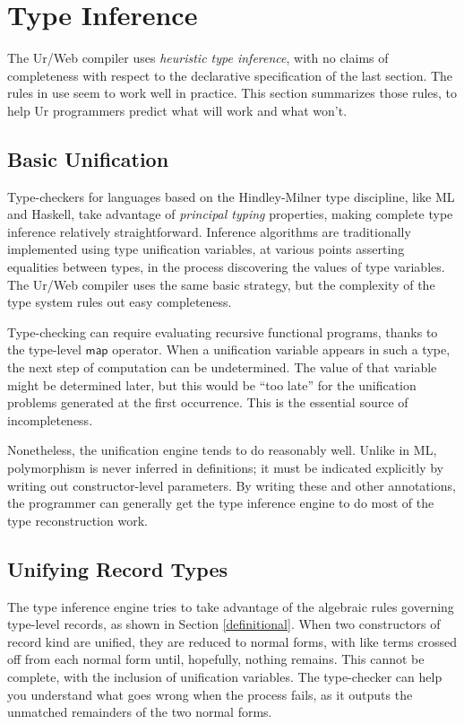 \documentclass{article}
\newcommand{\mt}[1]{\mathsf{#1}}
\begin{document}
\section{Type Inference}

The Ur/Web compiler uses \emph{heuristic type inference}, with no claims of completeness with respect to the declarative specification of the last section.  The rules in use seem to work well in practice.  This section summarizes those rules, to help Ur programmers predict what will work and what won't.

\subsection{Basic Unification}

Type-checkers for languages based on the Hindley-Milner type discipline, like ML and Haskell, take advantage of \emph{principal typing} properties, making complete type inference relatively straightforward.  Inference algorithms are traditionally implemented using type unification variables, at various points asserting equalities between types, in the process discovering the values of type variables.  The Ur/Web compiler uses the same basic strategy, but the complexity of the type system rules out easy completeness.

Type-checking can require evaluating recursive functional programs, thanks to the type-level $\mt{map}$ operator.  When a unification variable appears in such a type, the next step of computation can be undetermined.  The value of that variable might be determined later, but this would be ``too late'' for the unification problems generated at the first occurrence.  This is the essential source of incompleteness.

Nonetheless, the unification engine tends to do reasonably well.  Unlike in ML, polymorphism is never inferred in definitions; it must be indicated explicitly by writing out constructor-level parameters.  By writing these and other annotations, the programmer can generally get the type inference engine to do most of the type reconstruction work.

\subsection{Unifying Record Types}

The type inference engine tries to take advantage of the algebraic rules governing type-level records, as shown in Section \ref{definitional}.  When two constructors of record kind are unified, they are reduced to normal forms, with like terms crossed off from each normal form until, hopefully, nothing remains.  This cannot be complete, with the inclusion of unification variables.  The type-checker can help you understand what goes wrong when the process fails, as it outputs the unmatched remainders of the two normal forms.
\end{document}
